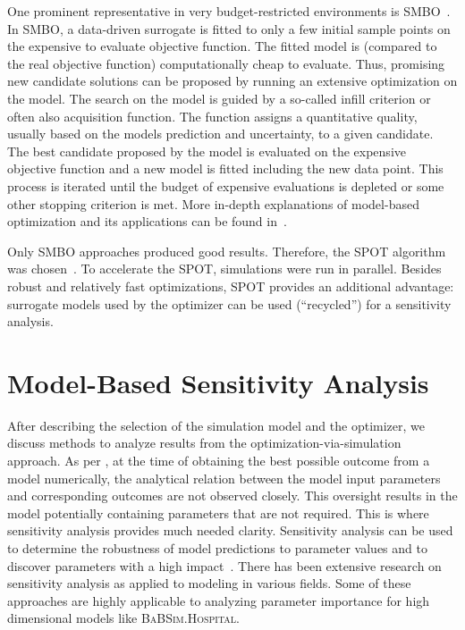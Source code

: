 \documentclass[conference]{IEEEtran}
\newcommand{\babsimhospital}{\textsc{BaBSim.Hospital}\xspace}
\begin{document}
 One prominent representative in very budget-restricted environments is \gls{SMBO}~\citep{Jin11a}.
In \gls{SMBO}, a data-driven surrogate is fitted to only a few initial sample points on the expensive to evaluate objective function. 
The fitted model is (compared to the real objective function) computationally cheap to evaluate.
Thus, promising new candidate solutions can be proposed by running an extensive optimization on the model.
The search on the model is guided by a so-called infill criterion or often also acquisition function.
The function assigns a quantitative quality, usually based on the models prediction and uncertainty, to a given candidate.
The best candidate proposed by the model is evaluated on the expensive objective function and a new model is fitted including the new data point.
This process is iterated until the budget of expensive evaluations is depleted or some other stopping criterion is met. More in-depth explanations of model-based optimization and its applications can be found in~\citet{Quei05a, EGOB02, Jin19a}.

Only \gls{SMBO} approaches produced good results. 
Therefore, the \gls{SPOT} algorithm was chosen~\citep{Bart17parxiv}.
To accelerate the \gls{SPOT}, simulations were run in parallel.
Besides robust and relatively fast optimizations, \gls{SPOT} provides an additional advantage: surrogate models used by the optimizer can be used (``recycled'') for a sensitivity analysis. 

\section{Model-Based Sensitivity Analysis}\label{sec:sa}
After describing the selection of the simulation model and the optimizer, we discuss 
methods to analyze results from the optimization-via-simulation approach. 
As per \citet{Ustinov15}, at the time of obtaining the best possible outcome from a model numerically, the analytical relation between the model input parameters and
corresponding outcomes are not observed closely. This oversight results in the model potentially containing parameters that are not required. This is where sensitivity analysis provides much needed clarity.
Sensitivity analysis can be used to determine the robustness of model predictions to parameter values and to discover parameters with a high impact~\citep{Rosa18}. There has been extensive research on sensitivity analysis as applied to modeling in various fields. Some of these approaches are highly applicable to analyzing parameter importance for high dimensional models like \babsimhospital. 
\end{document}
